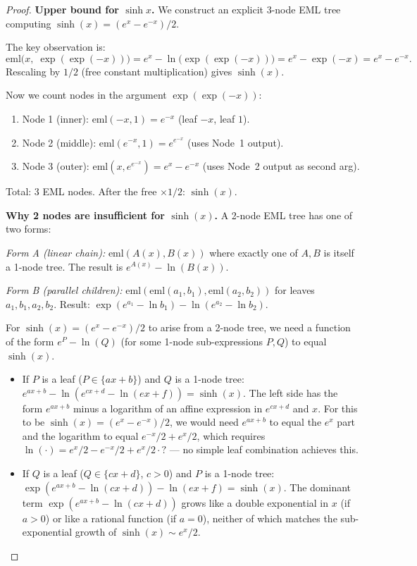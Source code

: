 \documentclass[12pt,a4paper]{article}
\theoremstyle{definition}
\theoremstyle{remark}
\begin{document}
\begin{proof}
\textbf{Upper bound for $\sinh x$.}
We construct an explicit 3-node EML tree computing $\sinh(x) = (e^x - e^{-x})/2$.

The key observation is:
\[
  \mathrm{eml}\!\bigl(x,\; \exp(\exp(-x))\bigr)
  = e^x - \ln\!\bigl(\exp(\exp(-x))\bigr)
  = e^x - \exp(-x)
  = e^x - e^{-x}.
\]
Rescaling by $1/2$ (free constant multiplication) gives $\sinh(x)$.

Now we count nodes in the argument $\exp(\exp(-x))$:
\begin{enumerate}
  \item Node 1 (inner): $\mathrm{eml}(-x, 1) = e^{-x}$ (leaf $-x$, leaf $1$).
  \item Node 2 (middle): $\mathrm{eml}(e^{-x}, 1) = e^{e^{-x}}$ (uses Node~1 output).
  \item Node 3 (outer): $\mathrm{eml}(x, e^{e^{-x}}) = e^x - e^{-x}$ (uses Node~2 output as second arg).
\end{enumerate}
Total: 3 EML nodes.  After the free $\times 1/2$: $\sinh(x)$.

\medskip
\textbf{Why 2 nodes are insufficient for $\sinh(x)$.}
A 2-node EML tree has one of two forms:

\textit{Form A (linear chain):} $\mathrm{eml}(A(x), B(x))$ where exactly one of $A,B$
is itself a 1-node tree.  The result is $e^{A(x)} - \ln(B(x))$.

\textit{Form B (parallel children):} $\mathrm{eml}(\mathrm{eml}(a_1,b_1),
\mathrm{eml}(a_2,b_2))$ for leaves $a_1,b_1,a_2,b_2$.
Result: $\exp(e^{a_1} - \ln b_1) - \ln(e^{a_2} - \ln b_2)$.

For $\sinh(x) = (e^x - e^{-x})/2$ to arise from a 2-node tree, we need a function of
the form $e^{P} - \ln(Q)$ (for some 1-node sub-expressions $P, Q$) to equal $\sinh(x)$.

\begin{itemize}
  \item If $P$ is a leaf ($P \in \{ax+b\}$) and $Q$ is a 1-node tree:
        $e^{ax+b} - \ln(e^{cx+d} - \ln(ex+f)) = \sinh(x)$.
        The left side has the form $e^{ax+b}$ minus a logarithm of an affine expression
        in $e^{cx+d}$ and $x$.  For this to be $\sinh(x) = (e^x - e^{-x})/2$, we would
        need $e^{ax+b}$ to equal the $e^x$ part and the logarithm to equal $e^{-x}/2 + e^x/2$,
        which requires $\ln(\cdot) = e^x/2 - e^{-x}/2 + e^x/2 \cdot \text{?}$ ---
        no simple leaf combination achieves this.

  \item If $Q$ is a leaf ($Q \in \{cx+d\}$, $c>0$) and $P$ is a 1-node tree:
        $\exp(e^{ax+b} - \ln(cx+d)) - \ln(ex+f) = \sinh(x)$.
        The dominant term $\exp(e^{ax+b} - \ln(cx+d))$ grows like a double exponential
        in $x$ (if $a>0$) or like a rational function (if $a=0$), neither of which
        matches the sub-exponential growth of $\sinh(x) \sim e^x/2$.
\end{itemize}


\end{proof}
\end{document}
